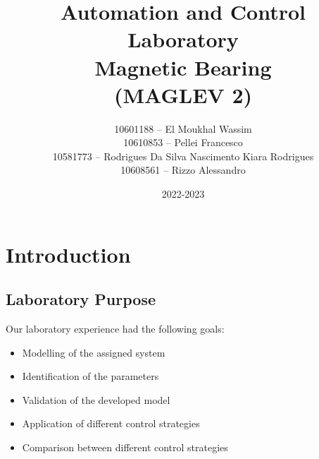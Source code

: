 \documentclass[a4paper, 11pt] {article}
\begin{document}
\title{%
  Automation and Control Laboratory \\
  \large Magnetic Bearing \\
    (MAGLEV 2)}
    
\bigskip
    
\author{ 10601188 – El Moukhal Wassim \\
10610853 – Pellei Francesco \\
10581773 – Rodrigues Da Silva Nascimento Kiara Rodrigues \\
10608561 – Rizzo Alessandro\\ }

\bigskip

\date{2022-2023} 

\maketitle

\newpage

\tableofcontents
\newpage



\section{Introduction}

\subsection{Laboratory Purpose}
Our laboratory experience had the following goals:
\begin{itemize}
\item Modelling of the assigned system
\item Identification of the parameters 
\item Validation of the developed model 
\item Application of different control strategies 
\item Comparison between different control strategies 
\end{itemize} 

      
\end{document}
